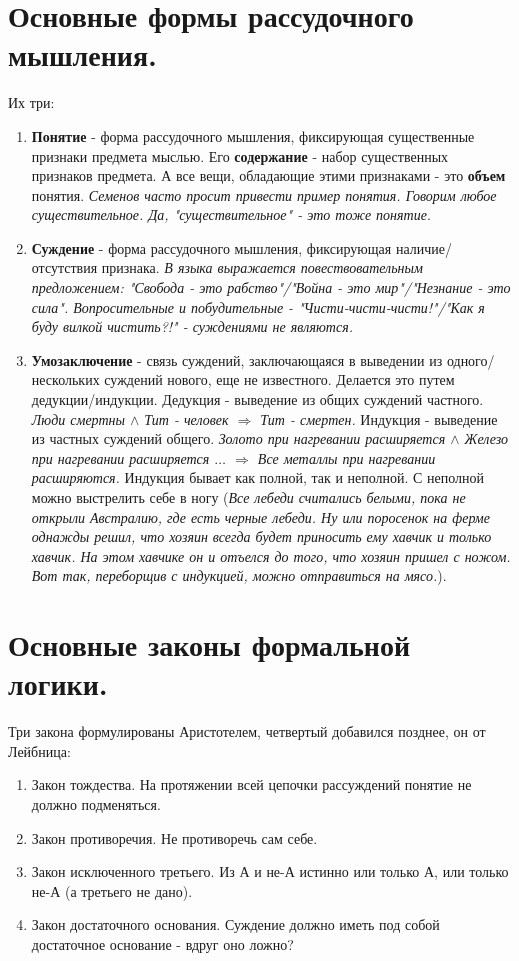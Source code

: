 \section{ Основные формы рассудочного мышления.}
Их три:
\begin{enumerate}
\item \textbf{Понятие} -
форма рассудочного мышления, фиксирующая существенные признаки предмета мыслью. Его \textbf{содержание} - набор существенных признаков предмета. А все вещи, обладающие этими признаками - это \textbf{объем} понятия. \textit{Семенов часто просит привести пример понятия. Говорим любое существительное. Да, "существительное" - это тоже понятие}.
\item \textbf{Суждение} - форма рассудочного мышления, фиксирующая наличие/отсутствия признака. \textit{В языка выражается повествовательным предложением: "Свобода - это рабство"/"Война - это мир"/"Незнание  - это сила". Вопросительные и побудительные - "Чисти-чисти-чисти!"/"Как я буду вилкой чистить?!" - суждениями не являются.}
\item \textbf{Умозаключение} - связь суждений, заключающаяся в выведении из одного/нескольких суждений нового, еще не известного. Делается это путем дедукции/индукции. Дедукция - выведение из общих суждений частного. \textit{Люди смертны $\wedge$ Тит - человек $\Rightarrow$ Тит - смертен.}
Индукция - выведение из частных суждений общего. \textit{Золото при нагревании расширяется $\wedge$ Железо при нагревании расширяется $\ldots$ $\Rightarrow$ Все металлы при нагревании расширяются.} Индукция бывает как полной, так и неполной. С неполной можно выстрелить себе в ногу (\textit{Все лебеди считались белыми, пока не открыли Австралию, где есть черные лебеди. Ну или поросенок на ферме однажды решил, что хозяин всегда будет приносить ему хавчик и только хавчик. На этом хавчике он и отъелся до того, что хозяин пришел с ножом. Вот так, переборщив с индукцией, можно отправиться на мясо.}).
\end{enumerate}

\section{ Основные законы формальной логики.}
Три закона формулированы Аристотелем, четвертый добавился позднее, он от Лейбница:
\begin{enumerate}
\item Закон тождества. На протяжении всей цепочки рассуждений понятие не должно подменяться.
\item Закон противоречия. Не противоречь сам себе.
\item Закон исключенного третьего. Из А и не-А истинно или только А, или только не-А (а третьего не дано).
\item Закон достаточного основания. Суждение должно иметь под собой достаточное основание - вдруг оно ложно?
\end{enumerate}

